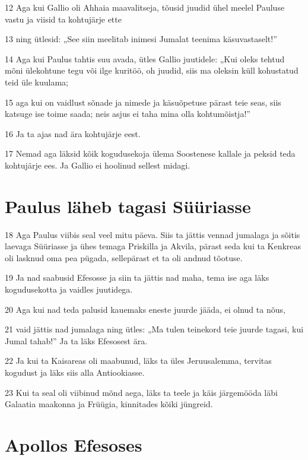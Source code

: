 \par 12 Aga kui Gallio oli Ahhaia maavalitseja, tõusid juudid ühel meelel Pauluse vastu ja viisid ta kohtujärje ette
\par 13 ning ütlesid: „See siin meelitab inimesi Jumalat teenima käsuvastaselt!”
\par 14 Aga kui Paulus tahtis suu avada, ütles Gallio juutidele: „Kui oleks tehtud mõni ülekohtune tegu või ilge kuritöö, oh juudid, siis ma oleksin küll kohustatud teid üle kuulama;
\par 15 aga kui on vaidlust sõnade ja nimede ja käsuõpetuse pärast teie seas, siis katsuge ise toime saada; neis asjus ei taha mina olla kohtumõistja!”
\par 16 Ja ta ajas nad ära kohtujärje eest.
\par 17 Nemad aga läksid kõik kogudusekoja ülema Soostenese kallale ja peksid teda kohtujärje ees. Ja Gallio ei hoolinud sellest midagi.

\section*{Paulus läheb tagasi Süüriasse}

\par 18 Aga Paulus viibis seal veel mitu päeva. Siis ta jättis vennad jumalaga ja sõitis laevaga Süüriasse ja ühes temaga Priskilla ja Akvila, pärast seda kui ta Kenkreas oli lasknud oma pea pügada, sellepärast et ta oli andnud tõotuse.
\par 19 Ja nad saabusid Efesosse ja siin ta jättis nad maha, tema ise aga läks kogudusekotta ja vaidles juutidega.
\par 20 Aga kui nad teda palusid kauemaks eneste juurde jääda, ei olnud ta nõus,
\par 21 vaid jättis nad jumalaga ning ütles: „Ma tulen teinekord teie juurde tagasi, kui Jumal tahab!” Ja ta läks Efesosest ära.
\par 22 Ja kui ta Kaisareas oli maabunud, läks ta üles Jeruusalemma, tervitas kogudust ja läks siis alla Antiookiasse.
\par 23 Kui ta seal oli viibinud mõnd aega, läks ta teele ja käis järgemööda läbi Galaatia maakonna ja Früügia, kinnitades kõiki jüngreid.

\section*{Apollos Efesoses}

